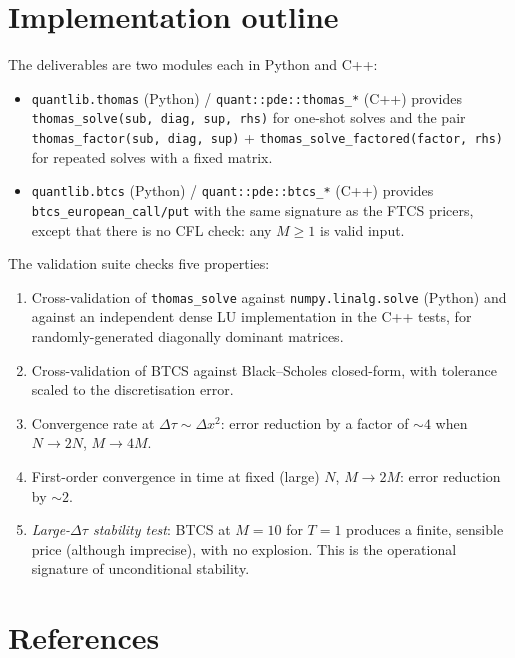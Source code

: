 \documentclass[11pt,a4paper]{article}
\begin{document}
\section{Implementation outline}

The deliverables are two modules each in Python and C++:

\begin{itemize}[leftmargin=2em]
\item \texttt{quantlib.thomas} (Python) / \texttt{quant::pde::thomas\_*}
(C++) provides
\texttt{thomas\_solve(sub, diag, sup, rhs)} for one-shot solves and
the pair \texttt{thomas\_factor(sub, diag, sup)} +
\texttt{thomas\_solve\_factored(factor, rhs)} for repeated solves
with a fixed matrix.
\item \texttt{quantlib.btcs} (Python) / \texttt{quant::pde::btcs\_*}
(C++) provides \texttt{btcs\_european\_call/put} with the same
signature as the FTCS pricers, except that there is no CFL check:
any $M \ge 1$ is valid input.
\end{itemize}

The validation suite checks five properties:
\begin{enumerate}[leftmargin=2em]
\item Cross-validation of \texttt{thomas\_solve} against
\texttt{numpy.linalg.solve} (Python) and against an independent dense
LU implementation in the C++ tests, for randomly-generated diagonally
dominant matrices.
\item Cross-validation of BTCS against Black--Scholes closed-form,
with tolerance scaled to the discretisation error.
\item Convergence rate at $\Delta\tau \sim \Delta x^2$: error reduction
by a factor of $\sim 4$ when $N \to 2N$, $M \to 4M$.
\item First-order convergence in time at fixed (large) $N$, $M \to
2M$: error reduction by $\sim 2$.
\item \emph{Large-$\Delta\tau$ stability test}: BTCS at $M = 10$
for $T = 1$ produces a finite, sensible price (although imprecise),
with no explosion. This is the operational signature of unconditional
stability.
\end{enumerate}

\section*{References}
\end{document}
